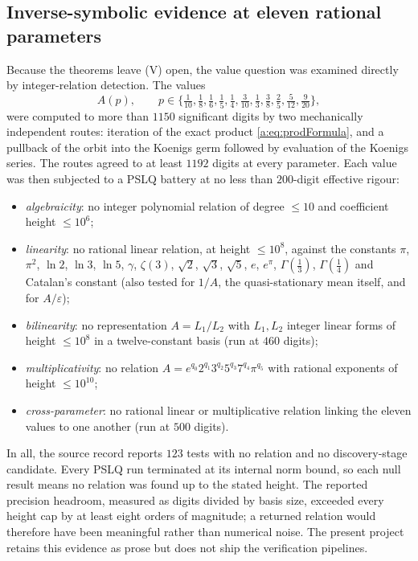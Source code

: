 \subsection{Inverse-symbolic evidence at eleven rational parameters}
\label{a:subsec:pslq}

Because the theorems leave (V) open, the value question was examined directly by
integer-relation detection.  The values
\[
A(p),\qquad p\in\bigl\{\tfrac1{10},\tfrac18,\tfrac16,\tfrac15,\tfrac14,\tfrac3{10},\tfrac13,\tfrac38,\tfrac25,\tfrac5{12},\tfrac9{20}\bigr\},
\]
were computed to more than $1150$ significant digits by two mechanically
independent routes: iteration of the exact product \eqref{a:eq:prodFormula}, and a
pullback of the orbit into the Koenigs germ followed by evaluation of the Koenigs
series.  The routes agreed to at least $1192$ digits at every parameter.  Each
value was then subjected to a PSLQ battery at no less than $200$-digit effective
rigour:
\begin{itemize}
\item \emph{algebraicity}: no integer polynomial relation of degree $\le10$ and coefficient height $\le10^{6}$;
\item \emph{linearity}: no rational linear relation, at height $\le10^{8}$, against the constants $\pi$, $\pi^{2}$, $\ln2$, $\ln3$, $\ln5$, $\gamma$, $\zeta(3)$, $\sqrt2$, $\sqrt3$, $\sqrt5$, $e$, $e^{\pi}$, $\Gamma(\tfrac13)$, $\Gamma(\tfrac14)$ and Catalan's constant (also tested for $1/A$, the quasi-stationary mean itself, and for $A/\varepsilon$);
\item \emph{bilinearity}: no representation $A=L_1/L_2$ with $L_1,L_2$ integer linear forms of height $\le10^{8}$ in a twelve-constant basis (run at $460$ digits);
\item \emph{multiplicativity}: no relation $A=e^{q_0}2^{q_1}3^{q_2}5^{q_3}7^{q_4}\pi^{q_5}$ with rational exponents of height $\le10^{10}$;
\item \emph{cross-parameter}: no rational linear or multiplicative relation linking the eleven values to one another (run at $500$ digits).
\end{itemize}
In all, the source record reports $123$ tests with no relation and no
discovery-stage candidate.  Every PSLQ run terminated at its internal norm bound,
so each null result means no relation was found up to the stated height.  The
reported precision headroom, measured as digits divided by basis size, exceeded
every height cap by at least eight orders of magnitude; a returned relation would
therefore have been meaningful rather than numerical noise.  The present project
retains this evidence as prose but does not ship the verification pipelines.

